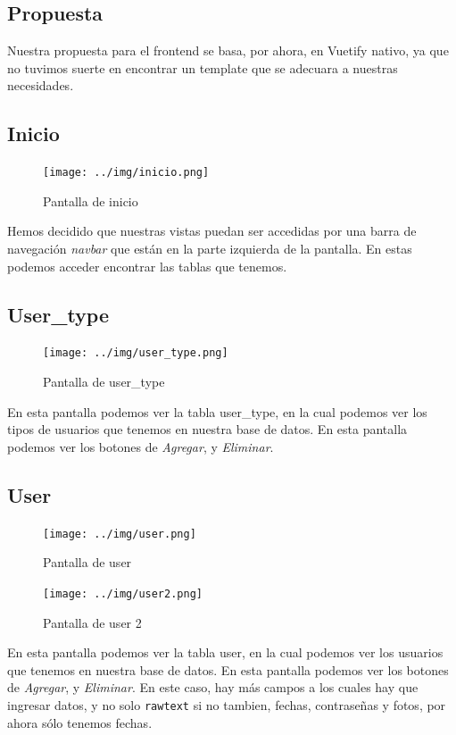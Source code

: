 \documentclass{article}
\begin{document}
\subsection{Propuesta}
Nuestra propuesta para el frontend se basa, por ahora, en Vuetify nativo, ya que no tuvimos suerte en encontrar un template que se adecuara a nuestras necesidades.

\subsection{Inicio}
\begin{figure}[h]
    \centering
    \texttt{[image: ../img/inicio.png]}
    \caption{Pantalla de inicio}
    \label{fig:Inicio}
\end{figure}

Hemos decidido que nuestras vistas puedan ser accedidas por una barra de navegación \textit{navbar} que están en la parte izquierda de la pantalla. En estas podemos acceder encontrar las tablas que tenemos. 

\subsection{User\_type}
\begin{figure}[!h]
    \centering
    \texttt{[image: ../img/user\_type.png]}
    \caption{Pantalla de user\_type}
    \label{fig:user_type}
\end{figure}

En esta pantalla podemos ver la tabla user\_type, en la cual podemos ver los tipos de usuarios que tenemos en nuestra base de datos. En esta pantalla podemos ver los botones de \textit{Agregar}, y \textit{Eliminar}. \pagebreak

\subsection{User}
\begin{figure}[!h]
    \centering
    \texttt{[image: ../img/user.png]}
    \caption{Pantalla de user}
    \label{fig:user}
\end{figure}

\begin{figure}[!h]
    \centering
    \texttt{[image: ../img/user2.png]}
    \caption{Pantalla de user 2}
    \label{fig:user}
\end{figure}



En esta pantalla podemos ver la tabla user, en la cual podemos ver los usuarios que tenemos en nuestra base de datos. En esta pantalla podemos ver los botones de \textit{Agregar}, y \textit{Eliminar}.
En este caso, hay más campos a los cuales hay que ingresar datos, y no solo \texttt{rawtext} si no tambien, fechas, contraseñas y fotos, por ahora sólo tenemos fechas.
\end{document}
